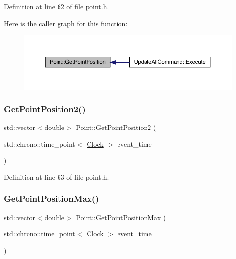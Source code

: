 Definition at line 62 of file point.\+h.

Here is the caller graph for this function\+:
\nopagebreak
\begin{figure}[H]
\begin{center}
\leavevmode
\includegraphics[width=350pt]{class_point_a521d229550d7f38851f9ffb1933046a6_icgraph}
\end{center}
\end{figure}
\mbox{\label{class_point_a98557a7ad341f981b13bb009994868f2}} 
\subsubsection{\texorpdfstring{Get\+Point\+Position2()}{GetPointPosition2()}}
{\footnotesize\ttfamily std\+::vector$<$double$>$ Point\+::\+Get\+Point\+Position2 (\begin{DoxyParamCaption}\item[{std\+::chrono\+::time\+\_\+point$<$ \hyperlink{universe_8h_a0ef8d951d1ca5ab3cfaf7ab4c7a6fd80}{Clock} $>$}]{event\+\_\+time }\end{DoxyParamCaption})\hspace{0.3cm}{\ttfamily [inline]}}



Definition at line 63 of file point.\+h.

\mbox{\label{class_point_afca47c5ea265894faf7b6aa4f4b17998}} 
\subsubsection{\texorpdfstring{Get\+Point\+Position\+Max()}{GetPointPositionMax()}}
{\footnotesize\ttfamily std\+::vector$<$double$>$ Point\+::\+Get\+Point\+Position\+Max (\begin{DoxyParamCaption}\item[{std\+::chrono\+::time\+\_\+point$<$ \hyperlink{universe_8h_a0ef8d951d1ca5ab3cfaf7ab4c7a6fd80}{Clock} $>$}]{event\+\_\+time }\end{DoxyParamCaption})\hspace{0.3cm}{\ttfamily [inline]}}



